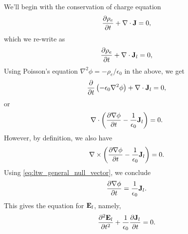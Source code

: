 \documentclass[a4paper,11pt]{report}
\begin{document}
We'll begin with the conservation of charge equation
\begin{equation*}
    \frac{\partial \rho_e}{\partial t} + \nabla \cdot \mathbf{J} = 0,
\end{equation*}
which we re-write as
\begin{equation*}
    \frac{\partial \rho_e}{\partial t} + \nabla \cdot \mathbf{J}_l = 0,
\end{equation*}
Using Poisson's equation $\nabla^2\phi = -\rho_e / \epsilon_0$ in the above, we get
\begin{equation*}
    \frac{\partial}{\partial t} \left ( -\epsilon_0 \nabla^2 \phi \right ) + \nabla \cdot \mathbf{J}_l = 0,
\end{equation*}
or
\begin{equation*}
    \nabla \cdot \left ( \frac{\partial \nabla \phi}{\partial t} - \frac{1}{\epsilon_0} \mathbf{J}_l \right ) = 0.
\end{equation*}
However, by definition, we also have
\begin{equation*}
    \nabla \times \left ( \frac{\partial \nabla \phi}{\partial t} - \frac{1}{\epsilon_0} \mathbf{J}_l \right ) = 0.
\end{equation*}
Using \cref{eq:ltw_general_null_vector}, we conclude
\begin{equation}
    \label{eq:emp_general_longitudinal_J}
    \frac{\partial \nabla \phi}{\partial t} = \frac{1}{\epsilon_0} \mathbf{J}_l.
\end{equation}
This gives the equation for $\mathbf{E}_l$, namely,
\begin{equation}
    \label{eq:emp_general_long_E}
    \frac{\partial^2 \mathbf{E}_l}{\partial t^2} + \frac{1}{\epsilon_0} \frac{\partial \mathbf{J}_l}{\partial t} = 0.
\end{equation}
\end{document}

